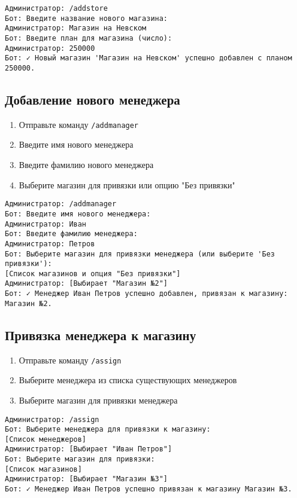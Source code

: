 \documentclass[a4paper,12pt]{article}
\begin{document}
\begin{tcolorbox}[colback=green!5, title=Пример добавления магазина]
\begin{verbatim}
Администратор: /addstore
Бот: Введите название нового магазина:
Администратор: Магазин на Невском
Бот: Введите план для магазина (число):
Администратор: 250000
Бот: ✓ Новый магазин 'Магазин на Невском' успешно добавлен с планом 250000.
\end{verbatim}
\end{tcolorbox}

\subsection{Добавление нового менеджера}
\begin{enumerate}
    \item Отправьте команду \texttt{/addmanager}
    \item Введите имя нового менеджера
    \item Введите фамилию нового менеджера
    \item Выберите магазин для привязки или опцию "Без привязки"
\end{enumerate}

\begin{tcolorbox}[colback=green!5, title=Пример добавления менеджера]
\begin{verbatim}
Администратор: /addmanager
Бот: Введите имя нового менеджера:
Администратор: Иван
Бот: Введите фамилию менеджера:
Администратор: Петров
Бот: Выберите магазин для привязки менеджера (или выберите 'Без привязки'):
[Список магазинов и опция "Без привязки"]
Администратор: [Выбирает "Магазин №2"]
Бот: ✓ Менеджер Иван Петров успешно добавлен, привязан к магазину: Магазин №2.
\end{verbatim}
\end{tcolorbox}

\subsection{Привязка менеджера к магазину}
\begin{enumerate}
    \item Отправьте команду \texttt{/assign}
    \item Выберите менеджера из списка существующих менеджеров
    \item Выберите магазин для привязки менеджера
\end{enumerate}

\begin{tcolorbox}[colback=green!5, title=Пример привязки менеджера]
\begin{verbatim}
Администратор: /assign
Бот: Выберите менеджера для привязки к магазину:
[Список менеджеров]
Администратор: [Выбирает "Иван Петров"]
Бот: Выберите магазин для привязки:
[Список магазинов]
Администратор: [Выбирает "Магазин №3"]
Бот: ✓ Менеджер Иван Петров успешно привязан к магазину Магазин №3.
\end{verbatim}
\end{tcolorbox}
\end{document}
